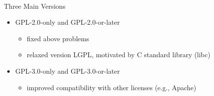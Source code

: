 \begin{frame}{\insertsubsection\ }
\begin{fancycolumns}
\begin{note}{Three Main Versions}
\begin{itemize}
\begin{itemize}
				\end{itemize}
				\item GPL-2.0-only and GPL-2.0-or-later
				\begin{itemize}
					\item fixed above problems
					\item relaxed version LGPL, motivated by C standard library (libc)
				\end{itemize}
				\item GPL-3.0-only and GPL-3.0-or-later
				\begin{itemize}
					\item improved compatibility with other licenses (e.g., Apache)
				\end{itemize}
			\end{itemize}
		\end{note}
	\end{fancycolumns}
\end{frame}

